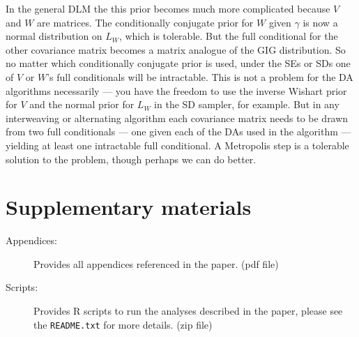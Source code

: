 \documentclass[12pt]{article}
\begin{document}
In the general DLM the this prior becomes much more complicated because $V$ and $W$ are matrices. The conditionally conjugate prior for $W$ given $\gamma$ is now a normal distribution on $L_W$, which is tolerable. But the full conditional for the other covariance matrix becomes a matrix analogue of the GIG distribution. So no matter which conditionally conjugate prior is used, under the SEs or SDs one of $V$ or $W$'s full conditionals will be intractable. This is not a problem for the DA algorithms necessarily --- you have the freedom to use the inverse Wishart prior for $V$ and the normal prior for $L_W$ in the SD sampler, for example. But in any interweaving or alternating algorithm each covariance matrix needs to be drawn from two full conditionals --- one given each of the DAs used in the algorithm --- yielding at least one intractable full conditional. A Metropolis step is a tolerable solution to the problem, though perhaps we can do better.

\section{Supplementary materials}\label{sec:Supp}

\begin{description}

\item[Appendices:] Provides all appendices referenced in the paper. (pdf file)

\item[Scripts:] Provides R scripts to run the analyses described in the paper, please see the \texttt{README.txt} for more details. (zip file)

\end{description}
\end{document}
